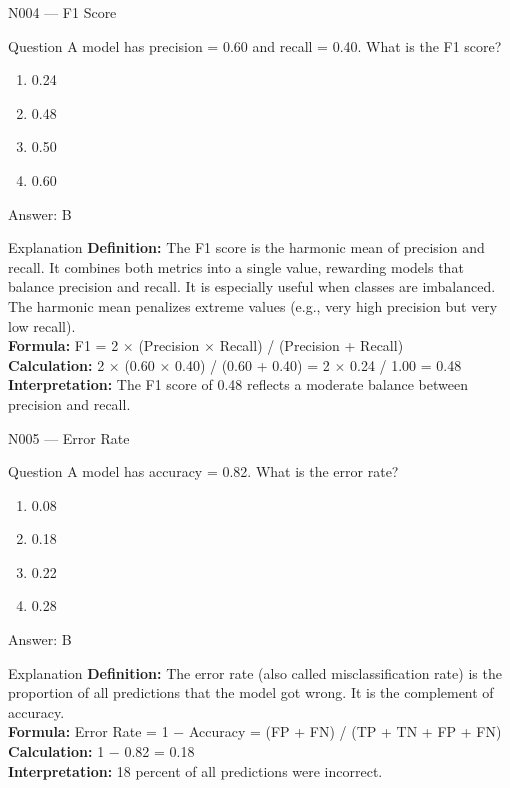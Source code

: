 \documentclass[aspectratio=169,8pt]{beamer}
\begin{document}
	\begin{frame}{N004 --- F1 Score}
		\begin{block}{Question}
			A model has precision = 0.60 and recall = 0.40. What is the F1 score?
			\begin{enumerate}
				\item 0.24
				\item 0.48
				\item 0.50
				\item 0.60
			\end{enumerate}
		\end{block}
		\begin{exampleblock}{Answer: B}\end{exampleblock}
		\begin{block}{Explanation}
			\textbf{Definition:} The F1 score is the harmonic mean of precision and recall. It combines both metrics into a single value, rewarding models that balance precision and recall. It is especially useful when classes are imbalanced. The harmonic mean penalizes extreme values (e.g., very high precision but very low recall).\\
			\textbf{Formula:} F1 = 2 $\times$ (Precision $\times$ Recall) / (Precision + Recall)\\
			\textbf{Calculation:} 2 $\times$ (0.60 $\times$ 0.40) / (0.60 + 0.40) = 2 $\times$ 0.24 / 1.00 = 0.48\\
			\textbf{Interpretation:} The F1 score of 0.48 reflects a moderate balance between precision and recall.
		\end{block}
	\end{frame}
	
	\begin{frame}{N005 --- Error Rate}
		\begin{block}{Question}
			A model has accuracy = 0.82. What is the error rate?
			\begin{enumerate}
				\item 0.08
				\item 0.18
				\item 0.22
				\item 0.28
			\end{enumerate}
		\end{block}
		\begin{exampleblock}{Answer: B}\end{exampleblock}
		\begin{block}{Explanation}
			\textbf{Definition:} The error rate (also called misclassification rate) is the proportion of all predictions that the model got wrong. It is the complement of accuracy.\\
			\textbf{Formula:} Error Rate = 1 $-$ Accuracy = (FP + FN) / (TP + TN + FP + FN)\\
			\textbf{Calculation:} 1 $-$ 0.82 = 0.18\\
			\textbf{Interpretation:} 18 percent of all predictions were incorrect.
		\end{block}
	\end{frame}
	
\end{document}
